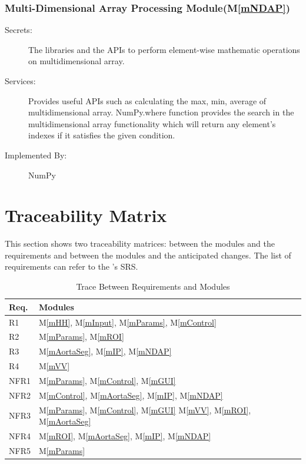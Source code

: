 \documentclass[12pt, titlepage]{article}
\newcommand{\mref}[1]{M\ref{#1}}
\begin{document}
\subsubsection{Multi-Dimensional Array Processing Module(\mref{mNDAP})}
\begin{description}
\item[Secrets:] The libraries and the APIs to perform element-wise mathematic operations on multidimensional array.
\item[Services:] Provides useful APIs such as calculating the max, min, average of multidimensional array. NumPy.where function provides the search in the multidimensional array functionality which will return any element's indexes if it satisfies the given condition.
\item[Implemented By:] NumPy
\end{description}

\newpage

\section{Traceability Matrix} \label{SecTM}

This section shows two traceability matrices: between the modules and the
requirements and between the modules and the anticipated changes. The list of requirements can refer to the \progname{}'s SRS. \cite{SRS}

\begin{table}[H]
\centering
\begin{tabular}{p{} p{}}
\toprule
\textbf{Req.} & \textbf{Modules}\\
\midrule
R1 & \mref{mHH}, \mref{mInput}, \mref{mParams}, \mref{mControl}\\
R2 & \mref{mParams}, \mref{mROI}\\
R3 &  \mref{mAortaSeg}, \mref{mIP}, \mref{mNDAP}\\
R4 & \mref{mVV}\\
NFR1 & \mref{mParams}, \mref{mControl}, \mref{mGUI}\\
NFR2 & \mref{mControl}, \mref{mAortaSeg}, \mref{mIP}, \mref{mNDAP}\\
NFR3 & \mref{mParams}, \mref{mControl}, \mref{mGUI} \mref{mVV}, \mref{mROI},  \mref{mAortaSeg}\\
NFR4 & \mref{mROI},  \mref{mAortaSeg}, \mref{mIP}, \mref{mNDAP}\\
NFR5 & \mref{mParams}\\
\bottomrule
\end{tabular}
\caption{Trace Between Requirements and Modules}
\label{TblRT}
\end{table}
\end{document}
